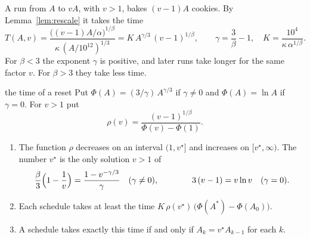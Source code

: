 \documentclass[11pt]{article}
\theoremstyle{boxed}
\begin{document}
A run from $A$ to $vA$, with $v>1$, bakes $(v-1)A$ cookies. By Lemma~\ref{lem:rescale} it takes
the time
\begin{equation}\label{eq:runtime}
  T(A,v)=\frac{\bigl((v-1)A/\alpha\bigr)^{1/\beta}}{\kappa\,(A/10^{12})^{1/3}}
  =K\,A^{\gamma/3}\,(v-1)^{1/\beta},\qquad
  \gamma=\frac3\beta-1,\quad K=\frac{10^{4}}{\kappa\,\alpha^{1/\beta}}.
\end{equation}
For $\beta<3$ the exponent $\gamma$ is positive, and later runs take longer for the same factor
$v$. For $\beta>3$ they take less time.

\begin{maintheorem}{the time of a reset}\label{thm:reset}
Put $\Phi(A)=(3/\gamma)\,A^{\gamma/3}$ if $\gamma\ne0$ and $\Phi(A)=\ln A$ if $\gamma=0$. For
$v>1$ put
\[
  \rho(v)=\frac{(v-1)^{1/\beta}}{\Phi(v)-\Phi(1)}.
\]
\begin{enumerate}[leftmargin=1.9em,label=\textup{(\alph*)}]
\item The function $\rho$ decreases on an interval $(1,v^{\star}]$ and increases on
$[v^{\star},\infty)$. The number $v^{\star}$ is the only solution $v>1$ of
\begin{equation}\label{eq:vstar}
  \frac\beta3\Bigl(1-\frac1v\Bigr)=\frac{1-v^{-\gamma/3}}{\gamma}\quad(\gamma\ne0),
  \qquad\qquad 3\,(v-1)=v\ln v\quad(\gamma=0).
\end{equation}
\item Each schedule takes at least the time $K\,\rho(v^{\star})\,\bigl(\Phi(A^{\ast})-\Phi(A_0)\bigr)$.
\item A schedule takes exactly this time if and only if $A_k=v^{\star}A_{k-1}$ for each $k$.
\end{enumerate}
\end{maintheorem}
\end{document}
